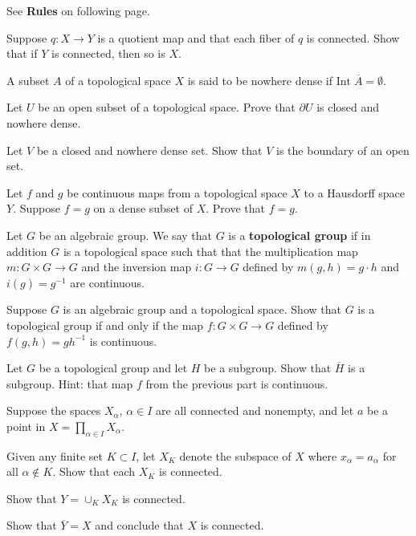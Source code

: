 \documentclass{homework651}
\def\ra{\rightarrow}
\begin{document}
See \textbf{Rules} on following page.

\begin{problems}
\problem Suppose $q: X\to Y$ is a quotient map and that each fiber of $q$ is connected.
Show that if $Y$ is connected, then so is $X$.

\problem A subset $A$ of a topological space $X$ is said to be nowhere dense if $\mathrm{Int}\; \overline{A} = \emptyset$.
\begin{subproblems}
\item Let $U$ be an open subset of a topological space. Prove that $\partial U$ is closed and nowhere dense.
\item Let $V$ be a closed and nowhere dense set. Show that $V$ is the boundary of an open set.
\end{subproblems}


\problem Let $f$ and $g$ be continuous maps from a topological space $X$ to a Hausdorff
space $Y$.  Suppose $f=g$ on a dense subset of $X$. Prove that $f=g$. 


\problem Let $G$ be an algebraic group.  We say that $G$ is a {\bf topological group}
if in addition $G$ is a topological space
such that that the multiplication
map $m:G\times G\ra G$ and the inversion map $i:G\ra G$ defined by $m(g,h)=g\cdot h$ and $i(g)=g^{-1}$
are continuous.
\begin{subproblems}
\item
Suppose $G$ is an algebraic group and a topological space.  Show that $G$ is a 
topological group if and only if the map $f:G\times G\ra G$ defined by $f(g,h)=g h^{-1}$
is continuous.
\item Let $G$ be a topological group and let $H$ be a subgroup.  Show that $\overline H$ is
a subgroup.  Hint: that map $f$ from the previous part is continuous. 

\end{subproblems}

\problem Suppose the spaces $X_\alpha$, $\alpha \in I$ are all connected
and nonempty, and let $a$ be a point in $X=\prod_{\alpha \in I} X_\alpha$.
\begin{subproblems}
\item Given any finite set $K\subset I$, let $X_K$ denote the subspace
of $X$ where $x_\alpha = a_\alpha$ for all $\alpha \not \in K$.  Show that 
each $X_K$ is connected.
\item Show that $Y = \cup_{K} X_K$ is connected.
\item Show that $\overline Y = X$ and conclude that $X$ is connected.
\end{subproblems}


\end{problems}
\end{document}

